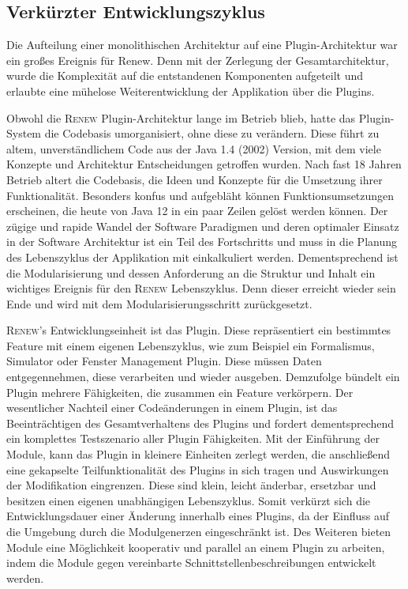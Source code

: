 	\subsection{Verkürzter Entwicklungszyklus}\label{sub:vez}
		Die Aufteilung einer monolithischen Architektur auf eine Plugin-Architektur war ein großes Ereignis für Renew. Denn mit der Zerlegung der Gesamtarchitektur, wurde die Komplexität auf die entstandenen Komponenten aufgeteilt und erlaubte eine mühelose Weiterentwicklung der Applikation über die Plugins. \bigbreak

		Obwohl die \textsc{Renew} Plugin-Architektur lange im Betrieb blieb, hatte das Plugin-System die Codebasis umorganisiert, ohne diese zu verändern. Diese führt zu altem, unverständlichem Code aus der Java 1.4 (2002) Version, mit dem viele Konzepte und Architektur Entscheidungen getroffen wurden. Nach fast 18 Jahren Betrieb altert die Codebasis, die Ideen und Konzepte für die Umsetzung ihrer Funktionalität. Besonders konfus und aufgebläht können Funktionsumsetzungen erscheinen, die heute von Java 12 in ein paar Zeilen gelöst werden können. Der zügige und rapide Wandel der Software Paradigmen und deren optimaler Einsatz in der Software Architektur ist ein Teil des Fortschritts und muss in die Planung des Lebenszyklus der Applikation mit einkalkuliert werden. \newline
		Dementsprechend ist die Modularisierung und dessen Anforderung an die Struktur und Inhalt ein wichtiges Ereignis für den \textsc{Renew} Lebenszyklus. Denn dieser erreicht wieder sein Ende und wird mit dem Modularisierungsschritt zurückgesetzt. \bigbreak

		\textsc{Renew}'s Entwicklungseinheit ist das Plugin. Diese repräsentiert ein bestimmtes Feature mit einem eigenen Lebenszyklus, wie zum Beispiel ein Formalismus, Simulator oder Fenster Management Plugin. Diese müssen Daten entgegennehmen, diese verarbeiten und wieder ausgeben. Demzufolge bündelt ein Plugin mehrere Fähigkeiten, die zusammen ein Feature verkörpern. Der wesentlicher Nachteil einer Codeänderungen in einem Plugin, ist das Beeinträchtigen des Gesamtverhaltens des Plugins und fordert dementsprechend ein komplettes Testszenario aller Plugin Fähigkeiten.\newline
		Mit der Einführung der Module, kann das Plugin in kleinere Einheiten zerlegt werden, die anschließend eine gekapselte Teilfunktionalität des Plugins in sich tragen und Auswirkungen der Modifikation eingrenzen. Diese sind klein, leicht änderbar, ersetzbar und besitzen einen eigenen unabhängigen Lebenszyklus. Somit verkürzt sich die Entwicklungsdauer einer Änderung innerhalb eines Plugins, da der Einfluss auf die Umgebung durch die Modulgenerzen eingeschränkt ist. Des Weiteren  bieten Module eine Möglichkeit kooperativ und parallel an einem Plugin zu arbeiten, indem die Module gegen vereinbarte Schnittstellenbeschreibungen entwickelt werden. \bigbreak

